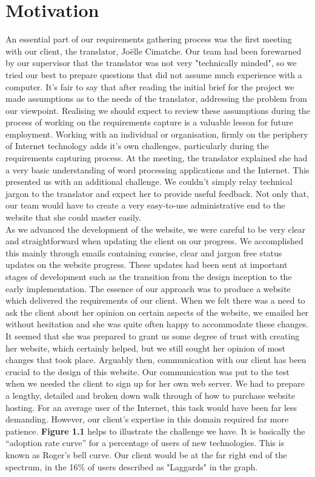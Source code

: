 \documentclass{l3proj}
\begin{document}
\section{Motivation}
An essential part of our requirements gathering process was the first meeting
with our client, the translator, Jo\"{e}lle Cimatche. Our team had been forewarned by our
supervisor that the translator was not very "technically minded", so we tried
our best to prepare questions that did not assume much experience with a
computer. It's fair to say that after reading the initial brief for the project
we made assumptions as to the needs of the translator, addressing the problem
from our viewpoint. Realising we should expect to review these assumptions
during the process of working on the requirements capture is a valuable lesson
for future employment. Working with an individual or organisation, firmly on the
periphery of Internet technology adds it's own challenges, particularly during
the requirements capturing process. At the meeting, the translator explained she
had a very basic understanding of word processing applications and the Internet. 
This presented us with an additional challenge. We couldn't
simply relay technical jargon to the translator and expect her to provide useful
feedback. Not only that, our team would have to create a very easy-to-use administrative
end to the website that she could master easily.\\
As we advanced the development of the website, we were careful to be very clear
and straightforward when updating the client on our progress. We accomplished this
mainly through emails containing concise, clear and jargon free status updates
on the website progress. These updates had been sent at important stages of
development such as the transition from the design inception to the early
implementation. The essence of our approach was to produce a website which delivered the requirements of our client. When we felt there
was a need to ask the client about her opinion on certain aspects of the
website, we emailed her without hesitation and she was quite often happy to
accommodate these changes. It seemed that she was prepared to grant us some
degree of trust with creating her website, which certainly helped, but we still
sought her opinion of most changes that took place. Arguably then, communication
with our client has been crucial to the design of this website. Our
communication was put to the test when we needed the client to sign up for her own
web server. We had to prepare a lengthy, detailed and broken down walk through
of how to purchase website hosting. For an average user of the Internet, this
task would have been far less demanding. However, our client's expertise in this
domain required far more patience. \textbf{Figure 1.1} helps to illustrate the
challenge we have. It is basically the ``adoption rate curve'' for a percentage of
users of new technologies. This is known as Roger's bell
curve. Our client would be at the far right end of the spectrum, in the 16\% of
users described as "Laggards" in the graph.\\
	
\end{document}
